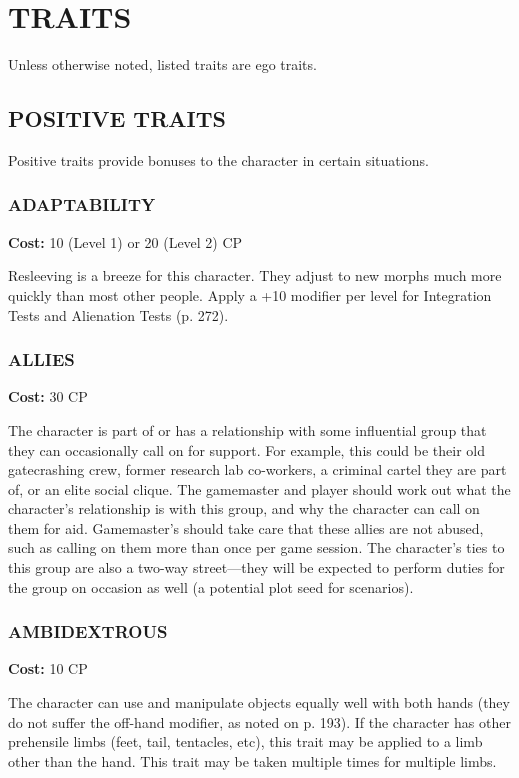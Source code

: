 \section{TRAITS}
Unless otherwise noted, listed traits are ego traits.

\subsection{POSITIVE TRAITS}
Positive traits provide bonuses to the character in certain situations.

\subsubsection{ADAPTABILITY}
\textbf{Cost:} 10 (Level 1) or 20 (Level 2) CP

Resleeving is a breeze for this character. They adjust to new morphs much more
quickly than most other people. Apply a +10 modifier per level for Integration
Tests and Alienation Tests (p. 272).

\subsubsection{ALLIES}
\textbf{Cost:} 30 CP

The character is part of or has a relationship with some influential group that
they can occasionally call on for support. For example, this could be their old
gatecrashing crew, former research lab co-workers, a criminal cartel they are
part of, or an elite social clique. The gamemaster and player should work out
what the character’s relationship is with this group, and why the character can
call on them for aid.  Gamemaster’s should take care that these allies are not
abused, such as calling on them more than once per game session. The
character’s ties to this group are also a two-way street—they will be expected
to perform duties for the group on occasion as well (a potential plot seed for
scenarios).

\subsubsection{AMBIDEXTROUS}
\textbf{Cost:} 10 CP

The character can use and manipulate objects equally well with both hands (they
do not suffer the off-hand modifier, as noted on p. 193). If the character
has other prehensile limbs (feet, tail, tentacles, etc), this trait may be
applied to a limb other than the hand. This trait may be taken multiple times
for multiple limbs.


